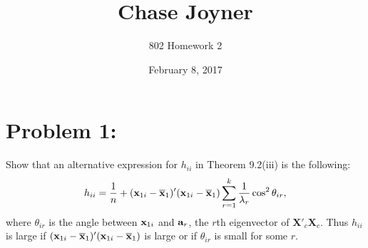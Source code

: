 \documentclass[11pt]{article}
\title{Chase Joyner}
\author{802 Homework 2}
\date{February 8, 2017}
\begin{document}
\maketitle

\section*{Problem 1:}
Show that an alternative expression for $h_{ii}$ in Theorem 9.2(iii) is the following:
\[
h_{ii} = \frac{1}{n} + ({\bf x}_{1i} - \overline{\mathbf{x}}_1)'({\bf x}_{1i} - \overline{\mathbf{x}}_1)\sum_{r=1}^k\frac{1}{\lambda_r}\cos^2\theta_{ir},
\]
where $\theta_{ir}$ is the angle between ${\bf x}_{1i}$ and ${\bf a}_r$, the $r$th eigenvector of $\mathbf{X}'_c\mathbf{X}_c$.  Thus $h_{ii}$ is large if $({\bf x}_{1i} - \overline{\mathbf{x}}_1)'({\bf x}_{1i} - \overline{\mathbf{x}}_1)$ is large or if $\theta_{ir}$ is small for some $r$.
\end{document}
